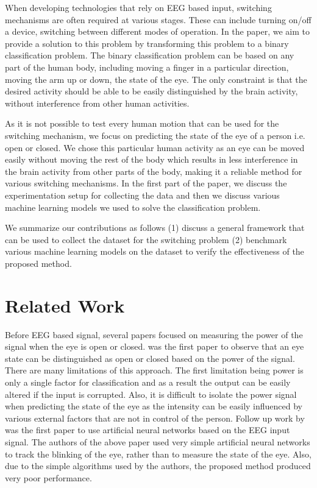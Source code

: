 \documentclass[10pt,twocolumn,letterpaper]{article}
\begin{document}
When developing technologies that rely on EEG based input, switching mechanisms are often required at various stages. These can include turning on/off a device, switching between different modes of operation. In the paper, we aim to provide a solution to this problem by transforming this problem to a binary classification problem. The binary classification problem can be based on any part of the human body, including moving a finger in a particular direction, moving the arm up or down, the state of the eye. The only constraint is that the desired activity should be able to be easily distinguished by the brain activity, without interference from other human activities.

As it is not possible to test every human motion that can be used for the switching mechanism, we focus on predicting the state of the eye of a person i.e. open or closed. We chose this particular human activity as an eye can be moved easily without moving the rest of the body which results in less interference in the brain activity from other parts of the body, making it a reliable method for various switching mechanisms. In the first part of the paper, we discuss the experimentation setup for collecting the data and then we discuss various machine learning models we used to solve the classification problem. 

We summarize our contributions as follows (1) discuss a general framework that can be used to collect the dataset for the switching problem (2) benchmark various machine learning models on the dataset to verify the effectiveness of the proposed method.

\section{Related Work}

Before EEG based signal, several papers focused on measuring the power of the signal when the eye is open or closed. \cite{paper1} was the first paper to observe that an eye state can be distinguished as open or closed based on the power of the signal. There are many limitations of this approach. The first limitation being power is only a single factor for classification and as a result the output can be easily altered if the input is corrupted. Also, it is difficult to isolate the power signal when predicting the state of the eye as the intensity can be easily influenced by various external factors that are not in control of the person. Follow up work by \cite{paper2} was the first paper to use artificial neural networks based on the EEG input signal. The authors of the above paper used very simple artificial neural networks to track the blinking of the eye, rather than to measure the state of the eye. Also, due to the simple algorithms used by the authors, the proposed method produced very poor performance.
\end{document}
